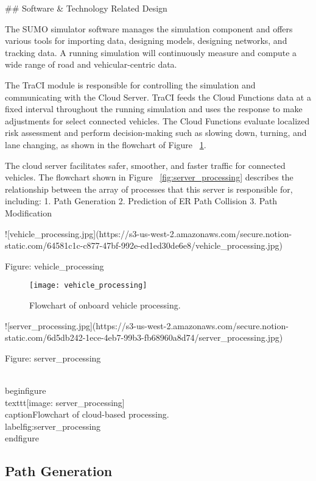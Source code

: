 ## Software & Technology Related Design

The SUMO simulator software manages the simulation component and offers various tools for importing data, designing models, designing networks, and tracking data. A running simulation will continuously measure and compute a wide range of road and vehicular-centric data.

The TraCI module is responsible for controlling the simulation and communicating with the Cloud Server. TraCI feeds the Cloud Functions data at a fixed interval throughout the running simulation and uses the response to make adjustments for select connected vehicles. The Cloud Functions evaluate localized risk assessment and perform decision-making such as slowing down, turning, and lane changing, as shown in the flowchart of Figure ~\ref{fig:vehicle_processing}.

The cloud server facilitates safer, smoother, and faster traffic for connected vehicles. The flowchart shown in Figure ~\ref{fig:server_processing} describes the relationship between the array of processes that this server is responsible for, including:
1. Path Generation
2. Prediction of ER Path Collision
3. Path Modification

![vehicle_processing.jpg](https://s3-us-west-2.amazonaws.com/secure.notion-static.com/64581c1c-c877-47bf-992e-ed1ed30de6e8/vehicle_processing.jpg)

Figure: vehicle_processing

\begin{figure}
\texttt{[image: vehicle\_processing]}
\caption{Flowchart of onboard vehicle processing.}
\label{fig:vehicle_processing}
\end{figure}

![server_processing.jpg](https://s3-us-west-2.amazonaws.com/secure.notion-static.com/6d5db242-1ece-4eb7-99b3-fb68960a8d74/server_processing.jpg)

Figure: server_processing

\\begin{figure}
	\\texttt{[image: server\_processing]}
	\\caption{Flowchart of cloud-based processing.}
	\\label{fig:server_processing}
\\end{figure}

\subsection{Path Generation}

